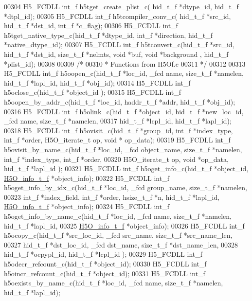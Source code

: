 \begin{DoxyCode}
00304 H5\_FCDLL int\_f h5tget\_create\_plist\_c( hid\_t\_f *dtype\_id,  hid\_t\_f *dtpl\_id);
00305 H5\_FCDLL int\_f h5tcompiler\_conv\_c( hid\_t\_f *src\_id, hid\_t\_f *dst\_id, int\_f *c\_flag);
00306 H5\_FCDLL int\_f h5tget\_native\_type\_c(hid\_t\_f *dtype\_id, int\_f *direction, hid\_t\_f *native\_dtype\_id);
00307 H5\_FCDLL int\_f h5tconvert\_c(hid\_t\_f *src\_id, hid\_t\_f *dst\_id, size\_t\_f *nelmts, \textcolor{keywordtype}{void} *buf, \textcolor{keywordtype}{void} *background
      , hid\_t\_f *plist\_id);
00308 
00309 \textcolor{comment}{/*}
00310 \textcolor{comment}{ * Functions from H5Of.c}
00311 \textcolor{comment}{ */}
00312 
00313 H5\_FCDLL int\_f h5oopen\_c(hid\_t\_f *loc\_id, \_fcd name, size\_t\_f *namelen, hid\_t\_f *lapl\_id, hid\_t\_f *obj\_id);
00314 H5\_FCDLL int\_f h5oclose\_c(hid\_t\_f *object\_id );
00315 H5\_FCDLL int\_f h5oopen\_by\_addr\_c(hid\_t\_f *loc\_id, haddr\_t\_f *addr, hid\_t\_f *obj\_id);
00316 H5\_FCDLL int\_f h5olink\_c(hid\_t\_f *object\_id, hid\_t\_f *new\_loc\_id, \_fcd name, size\_t\_f *namelen,
00317                hid\_t\_f *lcpl\_id, hid\_t\_f *lapl\_id);
00318 H5\_FCDLL int\_f h5ovisit\_c(hid\_t\_f *group\_id, int\_f *index\_type, int\_f *order, H5O\_iterate\_t op, \textcolor{keywordtype}{void} *
      op\_data);
00319 H5\_FCDLL int\_f h5ovisit\_by\_name\_c(hid\_t\_f *loc\_id,  \_fcd object\_name, size\_t\_f *namelen, int\_f *index\_type,
       int\_f *order,
00320                    H5O\_iterate\_t op, \textcolor{keywordtype}{void} *op\_data, hid\_t\_f *lapl\_id );
00321 H5\_FCDLL int\_f h5oget\_info\_c(hid\_t\_f *object\_id, \hyperlink{struct_h5_o__info__t__f}{H5O\_info\_t\_f} *object\_info);
00322 H5\_FCDLL int\_f h5oget\_info\_by\_idx\_c(hid\_t\_f *loc\_id, \_fcd  group\_name, size\_t\_f *namelen, 
00323                       int\_f *index\_field, int\_f *order, hsize\_t\_f *n, hid\_t\_f *lapl\_id, 
      \hyperlink{struct_h5_o__info__t__f}{H5O\_info\_t\_f} *object\_info);
00324 H5\_FCDLL int\_f h5oget\_info\_by\_name\_c(hid\_t\_f *loc\_id, \_fcd name, size\_t\_f *namelen, hid\_t\_f *lapl\_id,
00325                        \hyperlink{struct_h5_o__info__t__f}{H5O\_info\_t\_f} *object\_info);
00326 H5\_FCDLL int\_f h5ocopy\_c(hid\_t\_f *src\_loc\_id, \_fcd src\_name, size\_t\_f *src\_name\_len,
00327                hid\_t\_f *dst\_loc\_id, \_fcd dst\_name, size\_t\_f *dst\_name\_len, 
00328                hid\_t\_f *ocpypl\_id, hid\_t\_f *lcpl\_id );
00329 H5\_FCDLL int\_f h5odecr\_refcount\_c(hid\_t\_f *object\_id);
00330 H5\_FCDLL int\_f h5oincr\_refcount\_c(hid\_t\_f *object\_id);
00331 H5\_FCDLL int\_f h5oexists\_by\_name\_c(hid\_t\_f *loc\_id, \_fcd name, size\_t\_f *namelen, hid\_t\_f *lapl\_id);

\end{DoxyCode}
